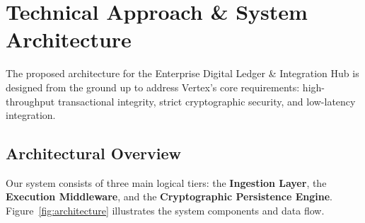 \section{Technical Approach \& System Architecture}
\label{sec:technical_approach}

The proposed architecture for the Enterprise Digital Ledger \& Integration Hub is designed from the ground up to address Vertex's core requirements: high-throughput transactional integrity, strict cryptographic security, and low-latency integration.

\subsection{Architectural Overview}
Our system consists of three main logical tiers: the \textbf{Ingestion Layer}, the \textbf{Execution Middleware}, and the \textbf{Cryptographic Persistence Engine}. Figure~\ref{fig:architecture} illustrates the system components and data flow.

